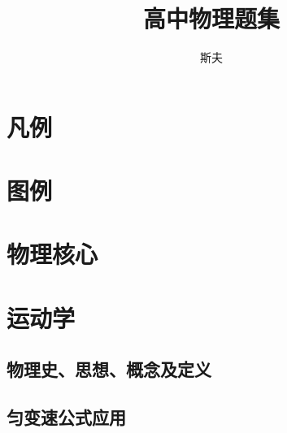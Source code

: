\documentclass[cn,blue,11pt,normal]{elegantnote}
\title{高中物理题集}
\author{斯夫}
\date{\jintian}
\begin{document}
%

\newpage

\section*{凡例}

\section*{图例}


\iffalse

\newpage
\section{物理核心}
\begin{proset}
	
\end{proset}

\newpage
\section{运动学}

\subsection{物理史、思想、概念及定义}

\begin{proset}
	
\end{proset}
\begin{proset}
	
\end{proset}
\begin{proset}
	
\end{proset}
\begin{proset}
	
\end{proset}

\subsection{匀变速公式应用}
\end{document}
